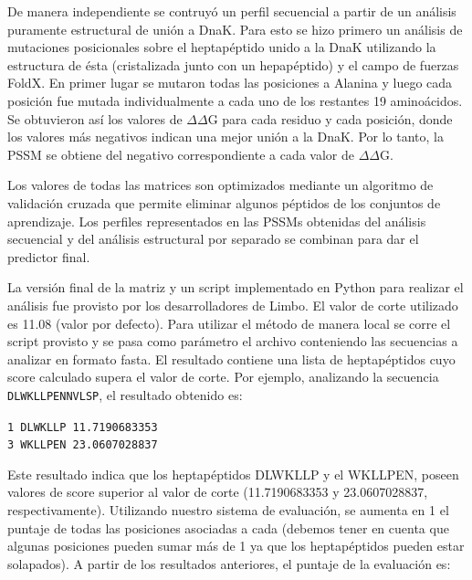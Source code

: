 De manera independiente se contruyó un perfil secuencial a partir de un análisis puramente estructural de unión a DnaK.
Para esto se hizo primero un análisis de mutaciones posicionales sobre el heptapéptido unido a la DnaK utilizando la estructura de ésta (cristalizada junto con un hepapéptido) y el campo de fuerzas FoldX. 
En primer lugar se mutaron todas las posiciones a Alanina y luego cada posición fue mutada individualmente a cada uno de los restantes 19 aminoácidos.
Se obtuvieron así los valores de $\Delta\Delta$G para cada residuo y cada posición, donde los valores más negativos indican una mejor unión a la DnaK.
Por lo tanto, la PSSM se obtiene del negativo correspondiente a cada valor de $\Delta\Delta$G.

Los valores de todas las matrices son optimizados mediante un algoritmo de validación cruzada que permite eliminar algunos péptidos de los conjuntos de aprendizaje.
Los perfiles representados en las PSSMs obtenidas del análisis secuencial y del análisis estructural por separado se combinan para dar el predictor final. 


La versión final de la matriz y un script implementado en Python para realizar el análisis fue provisto por los desarrolladores de Limbo.
El valor de corte utilizado es 11.08 (valor por defecto). Para utilizar el método de manera local se corre el script provisto y se pasa como parámetro el archivo conteniendo las secuencias a analizar en formato fasta.
El resultado contiene una lista de heptapéptidos cuyo score calculado supera el valor de corte.
Por ejemplo, analizando la secuencia \texttt{DLWKLLPENNVLSP}, el resultado obtenido es:

	\texttt{1 DLWKLLP 11.7190683353}   \\
\indent \texttt{3 WKLLPEN 23.0607028837} 

Este resultado indica que los heptapéptidos DLWKLLP y el WKLLPEN, poseen valores de score superior al valor de corte (11.7190683353 y 23.0607028837, respectivamente).
Utilizando nuestro sistema de evaluación, se aumenta en 1 el puntaje de todas las posiciones asociadas a cada (debemos tener en cuenta que algunas posiciones pueden sumar más de 1 ya que los heptapéptidos pueden estar solapados).
A partir de los resultados anteriores, el puntaje de la evaluación es:

